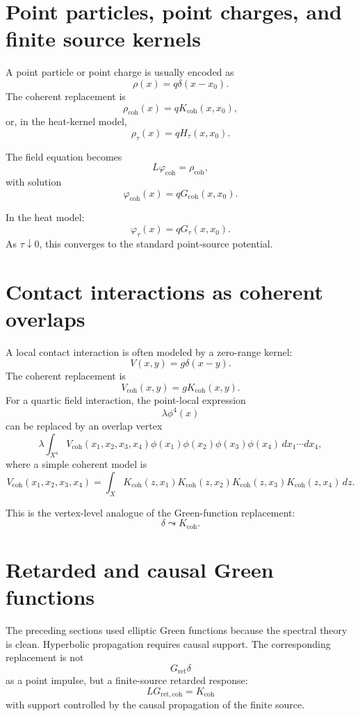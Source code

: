 \documentclass[11pt]{article}
\begin{document}
\section{Point particles, point charges, and finite source kernels}

A point particle or point charge is usually encoded as
\[
\rho(x)=q\delta(x-x_0).
\]
The coherent replacement is
\[
\rho_{\mathrm{coh}}(x)=qK_{\mathrm{coh}}(x,x_0),
\]
or, in the heat-kernel model,
\[
\rho_\tau(x)=qH_\tau(x,x_0).
\]

The field equation becomes
\[
L\varphi_{\mathrm{coh}}=\rho_{\mathrm{coh}},
\]
with solution
\[
\varphi_{\mathrm{coh}}(x)=qG_{\mathrm{coh}}(x,x_0).
\]

In the heat model:
\[
\varphi_\tau(x)=qG_\tau(x,x_0).
\]
As \(\tau\downarrow0\), this converges to the standard point-source potential.

\section{Contact interactions as coherent overlaps}

A local contact interaction is often modeled by a zero-range kernel:
\[
V(x,y)=g\delta(x-y).
\]
The coherent replacement is
\[
V_{\mathrm{coh}}(x,y)=gK_{\mathrm{coh}}(x,y).
\]
For a quartic field interaction, the point-local expression
\[
\lambda\phi^4(x)
\]
can be replaced by an overlap vertex
\[
\lambda\int_{X^4}V_{\mathrm{coh}}(x_1,x_2,x_3,x_4)
\phi(x_1)\phi(x_2)\phi(x_3)\phi(x_4)\,dx_1\cdots dx_4,
\]
where a simple coherent model is
\[
V_{\mathrm{coh}}(x_1,x_2,x_3,x_4)
=
\int_X K_{\mathrm{coh}}(z,x_1)K_{\mathrm{coh}}(z,x_2)
K_{\mathrm{coh}}(z,x_3)K_{\mathrm{coh}}(z,x_4)\,dz.
\]

This is the vertex-level analogue of the Green-function replacement:
\[
\delta \leadsto K_{\mathrm{coh}}.
\]

\section{Retarded and causal Green functions}

The preceding sections used elliptic Green functions because the spectral theory is clean. Hyperbolic propagation requires causal support. The corresponding replacement is not
\[
G_{\mathrm{ret}}\delta
\]
as a point impulse, but a finite-source retarded response:
\[
L G_{\mathrm{ret,coh}} = K_{\mathrm{coh}}
\]
with support controlled by the causal propagation of the finite source.
\end{document}
